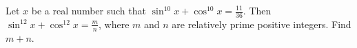 Let $x$ be a real number such that $\sin^{10}x+\cos^{10}x=\frac{11}{36}$. Then $\sin^{12}x+\cos^{12}x=\frac{m}{n}$, where $m$ and $n$ are relatively prime positive integers. Find $m+n$.